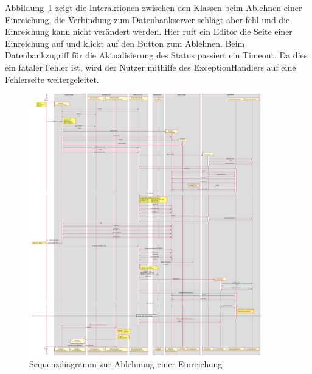 Abbildung~\ref{fig:rejection-sequence} zeigt die Interaktionen zwischen den Klassen beim Ablehnen einer Einreichung, die Verbindung zum Datenbankserver schlägt aber fehl und die Einreichung kann nicht verändert werden.
Hier ruft ein Editor die Seite einer Einreichung auf und klickt auf den Button zum Ablehnen.
Beim Datenbankzugriff für die Aktualisierung des Status passiert ein Timeout.
Da dies ein fataler Fehler ist, wird der Nutzer mithilfe des ExceptionHandlers auf eine Fehlerseite weitergeleitet.

\begin{figure}[H]
    \centering
    \includegraphics[width=0.9\textwidth]{graphics/reject_submission}
    \caption{Sequenzdiagramm zur Ablehnung einer Einreichung}
    \label{fig:rejection-sequence}
\end{figure}
